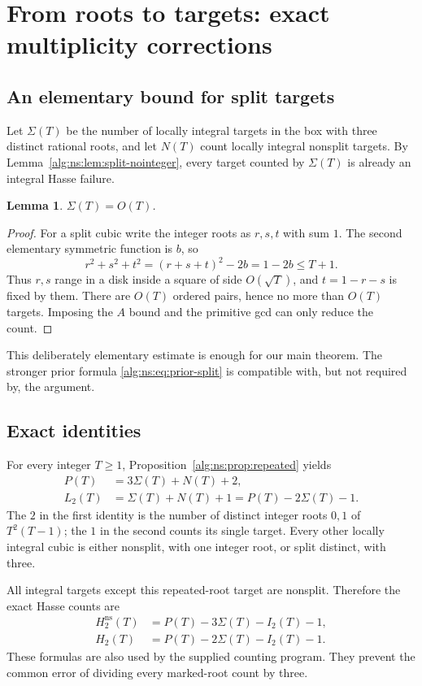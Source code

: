\documentclass[11pt]{article}
\numberwithin{equation}{section}
\theoremstyle{plain}
\theoremstyle{plain}
\newtheorem{lemma}[lemma]{Lemma}
\theoremstyle{plain}
\theoremstyle{definition}
\theoremstyle{definition}
\theoremstyle{definition}
\theoremstyle{remark}
\newcommand{\NS}{\mathrm{ns}}\newcommand{\spc}{\mathrm{sp}}
\begin{document}
\section{From roots to targets: exact multiplicity corrections}\label{alg:ns:sec:mult}

\subsection{An elementary bound for split targets}
Let $\Sigma(T)$ be the number of locally integral targets in the box with
three distinct rational roots, and let $N(T)$ count locally integral
nonsplit targets. By Lemma~\ref{alg:ns:lem:split-nointeger}, every target
counted by $\Sigma(T)$ is already an integral Hasse failure.

\begin{lemma}\label{alg:ns:lem:splitbound}
$\Sigma(T)=O(T)$.
\end{lemma}
\begin{proof}
For a split cubic write the integer roots as $r,s,t$ with sum $1$.
The second elementary symmetric function is $b$, so
\[
r^2+s^2+t^2=(r+s+t)^2-2b=1-2b\le T+1.
\]
Thus $r,s$ range in a disk inside a square of side $O(\sqrt T)$, and
$t=1-r-s$ is fixed by them. There are $O(T)$ ordered pairs, hence no
more than $O(T)$ targets. Imposing the $A$ bound and the primitive gcd
can only reduce the count.
\end{proof}
This deliberately elementary estimate is enough for our main theorem.
The stronger prior formula \eqref{alg:ns:eq:prior-split} is compatible with,
but not required by, the argument.

\subsection{Exact identities}
For every integer $T\ge1$, Proposition~\ref{alg:ns:prop:repeated} yields
\begin{align}
P(T)&=3\Sigma(T)+N(T)+2,\label{alg:ns:eq:multiplicity-P}\\
L_2(T)&=\Sigma(T)+N(T)+1=P(T)-2\Sigma(T)-1.\label{alg:ns:eq:multiplicity-L}
\end{align}
The $2$ in the first identity is the number of distinct integer roots
$0,1$ of $T^2(T-1)$; the $1$ in the second counts its single target.
Every other locally integral cubic is either nonsplit, with one integer
root, or split distinct, with three.

All integral targets except this repeated-root target are nonsplit.
Therefore the exact Hasse counts are
\begin{align}
H_2^{\NS}(T)&=P(T)-3\Sigma(T)-I_2(T)-1,\label{alg:ns:eq:exact-NS}\\
H_2(T)&=P(T)-2\Sigma(T)-I_2(T)-1.\label{alg:ns:eq:exact-H}
\end{align}
These formulas are also used by the supplied counting program. They
prevent the common error of dividing every marked-root count by three.
\end{document}
